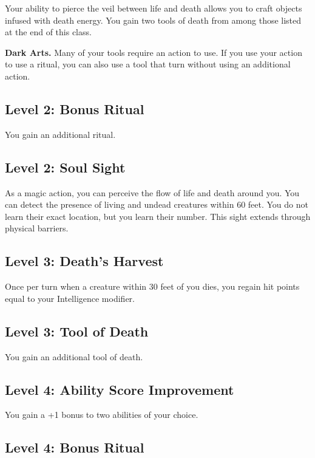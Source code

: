 \documentclass[12pt,letterpaper,twocolumn,openany,nodeprecatedcode,bg=none]{dndbook}
\begin{document}
Your ability to pierce the veil between life and death allows you to
craft objects infused with death energy. You gain two tools of death
from among those listed at the end of this class.

\textbf{Dark Arts.} Many of your tools require an action to use. If you
use your action to use a ritual, you can also use a tool that turn
without using an additional action.

\subsection{Level 2: Bonus Ritual}\label{level-2-bonus-ritual}

You gain an additional ritual.

\subsection{Level 2: Soul Sight}\label{level-2-soul-sight}

As a magic action, you can perceive the flow of life and death around
you. You can detect the presence of living and undead creatures within
60 feet. You do not learn their exact location, but you learn their
number. This sight extends through physical barriers.

\subsection{Level 3: Death's Harvest}\label{level-3-deaths-harvest}

Once per turn when a creature within 30 feet of you dies, you regain hit
points equal to your Intelligence modifier.

\subsection{Level 3: Tool of Death}\label{level-3-tool-of-death}

You gain an additional tool of death.

\subsection{Level 4: Ability Score
Improvement}\label{level-4-ability-score-improvement}

You gain a +1 bonus to two abilities of your choice.

\subsection{Level 4: Bonus Ritual}\label{level-4-bonus-ritual}
\end{document}
